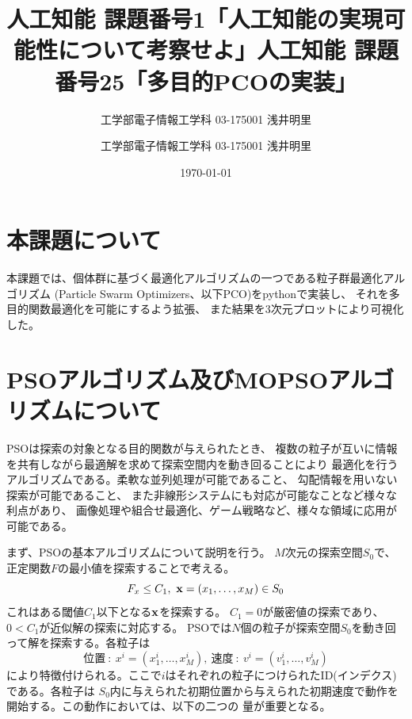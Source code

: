 \documentclass[uplatex]{jsarticle}
\title{人工知能 課題番号1「人工知能の実現可能性について考察せよ」}
\author{工学部電子情報工学科 03-175001 浅井明里}
\title{人工知能 課題番号25「多目的PCOの実装」}
\author{工学部電子情報工学科 03-175001 浅井明里}
\date{\today}
\makeatletter
\def\maketitle{%
  \null
  \thispagestyle{empty}%
  \vfill
  \begin{center}\leavevmode
    \normalfont
    {\LARGE \@title\par}%
    \vskip 1cm
    {\Large \@author\par}%
    \vskip 1cm
    {\Large \@date\par}%
  \end{center}%
  \vfill
  \null
  \@thanks%
  \cleardoublepage
  }
\makeatother
\begin{document}
\maketitle


\section{本課題について}
本課題では、個体群に基づく最適化アルゴリズムの一つである粒子群最適化アルゴリズム
(Particle Swarm Optimizers、以下PCO)をpythonで実装し、
それを多目的関数最適化を可能にするよう拡張、
また結果を3次元プロットにより可視化した。

\section{PSOアルゴリズム及びMOPSOアルゴリズムについて}
PSOは探索の対象となる目的関数が与えられたとき、
複数の粒子が互いに情報を共有しながら最適解を求めて探索空間内を動き回ることにより
最適化を行うアルゴリズムである。柔軟な並列処理が可能であること、
勾配情報を用いない探索が可能であること、
また非線形システムにも対応が可能なことなど様々な利点があり、
画像処理や組合せ最適化、ゲーム戦略など、様々な領域に応用が可能である。

まず、PSOの基本アルゴリズムについて説明を行う。
$M$次元の探索空間$S_0$で、正定関数$F$の最小値を探索することで考える。
$$F_x \leq C_1,\ {\bf x} = (x_1, \ldots , x_M) \in S_0$$
これはある閾値$C_1$以下となる${\bf x}$を探索する。
$C_1 = 0$が厳密値の探索であり、$0 < C_1$が近似解の探索に対応する。
PSOでは$N$個の粒子が探索空間$S_0$を動き回って解を探索する。各粒子は
$$位置\ :\ x^i = (x_1^i, \ldots, x_M^i),\ 速度\ :\ v^i = (v_1^i, \ldots, v_M^i)$$
により特徴付けられる。ここで$i$はそれぞれの粒子につけられたID(インデクス)である。各粒子は
$S_0$内に与えられた初期位置から与えられた初期速度で動作を開始する。この動作においては、以下の二つの
量が重要となる。
\end{document}
